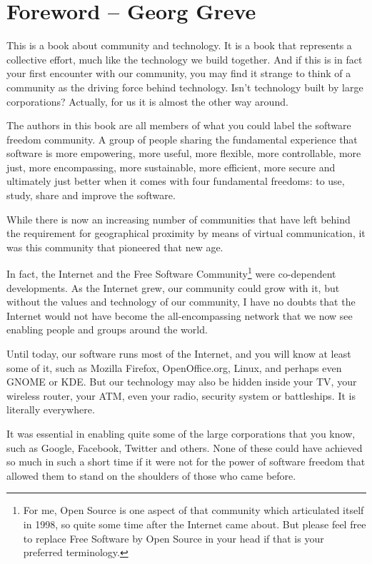 \section*{Foreword -- Georg Greve}

This is a book about community and technology. It is a book that
represents a collective effort, much like the technology we build
together. And if this is in fact your first encounter with our
community, you may find it strange to think of a community as the
driving force behind technology. Isn't technology built by large
corporations? Actually, for us it is almost the other way around.

The authors in this book are all members of what you could label the
software freedom community. A group of people sharing the fundamental
experience that software is more empowering, more useful, more
flexible, more controllable, more just, more encompassing, more
sustainable, more efficient, more secure and ultimately just better
when it comes with four fundamental freedoms: to use, study, share and
improve the software.

While there is now an increasing number of communities that have left
behind the requirement for geographical proximity by means of virtual
communication, it was this community that pioneered that new age. 

In fact, the Internet and the Free Software Community\footnote{For me,
  Open Source is one aspect of that community which articulated itself
  in 1998, so quite some time after the Internet came about. But
  please feel free to replace Free Software by Open Source in your
  head if that is your preferred terminology.}  were co-dependent
developments. As the Internet grew, our community could grow with it,
but without the values and technology of our community, I have no doubts
that the Internet would not have become the
all-encompassing network that we now see enabling people and groups
around the world.

Until today, our software runs most of the Internet, and you will know
at least some of it, such as Mozilla Firefox,
OpenOffice.org, Linux, and perhaps even GNOME or KDE. But our
technology may also be hidden inside your TV, your wireless
router, your ATM, even your radio, security system or battleships. It
is literally everywhere. 

It was essential in enabling quite some of the large corporations
that you know, such as Google, Facebook, Twitter and others. None of
these could have achieved so much in such a short time if it were not
for the power of software freedom that allowed them to stand on the
shoulders of those who came before.

